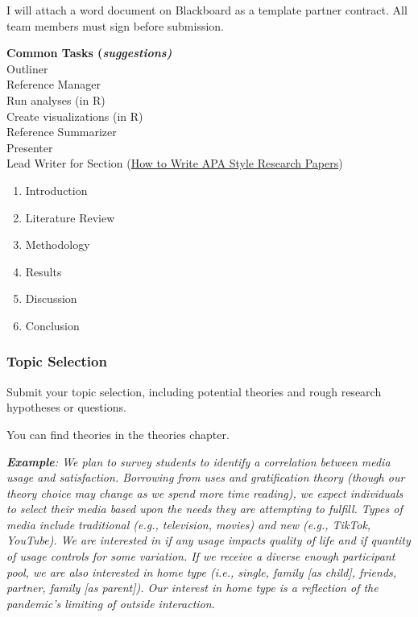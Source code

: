 \documentclass[
  b5paper]{book}
\begin{document}
I will attach a word document on Blackboard as a template partner contract. All team members must sign before submission.

\textbf{Common Tasks (\emph{suggestions)}\\
}Outliner\\
Reference Manager\\
Run analyses (in R)\\
Create visualizations (in R)\\
Reference Summarizer\\
Presenter\\
Lead Writer for Section (\href{https://psychology.ucsd.edu/_files/undergrad/writingresearchpapersinapastyleguide.pdf}{How to Write APA Style Research Papers})

\begin{enumerate}
\def\labelenumi{\arabic{enumi}.}
\item
  Introduction
\item
  Literature Review
\item
  Methodology
\item
  Results
\item
  Discussion
\item
  Conclusion
\end{enumerate}

\hypertarget{topic-selection}{%
\subsubsection*{Topic Selection}\label{topic-selection}}

Submit your topic selection, including potential theories and rough research hypotheses or questions.

You can find theories in the theories chapter.

\emph{\textbf{Example}: We plan to survey students to identify a correlation between media usage and satisfaction. Borrowing from uses and gratification theory (though our theory choice may change as we spend more time reading), we expect individuals to select their media based upon the needs they are attempting to fulfill. Types of media include traditional (e.g., television, movies) and new (e.g., TikTok, YouTube). We are interested in if any usage impacts quality of life and if quantity of usage controls for some variation. If we receive a diverse enough participant pool, we are also interested in home type (i.e., single, family {[}as child{]}, friends, partner, family {[}as parent{]}). Our interest in home type is a reflection of the pandemic's limiting of outside interaction.}
\end{document}
